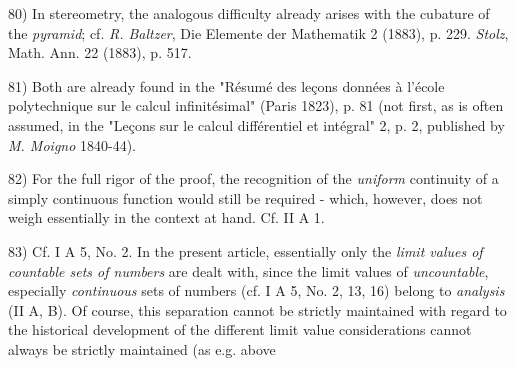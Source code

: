 \vfill
\leftline{\rule{2in}{0.4pt}}
\vspace{0.2cm}
{
\footnotesize
80) In stereometry, the analogous difficulty already arises with the cubature of the \textit{pyramid}; cf. \textit{R. Baltzer}, Die Elemente der Mathematik 2 (1883), p. 229. \textit{Stolz}, Math. Ann. 22 (1883), p. 517.

81) Both are already found in the "Résumé des leçons données à l'école polytechnique sur le calcul infinitésimal" (Paris 1823), p. 81 (not first, as is often assumed, in the "Leçons sur le calcul différentiel et intégral" 2, p. 2, published by \textit{M. Moigno} 1840-44).

82) For the full rigor of the proof, the recognition of the \textit{uniform} continuity of a simply continuous function would still be required - which, however, does not weigh essentially in the context at hand. Cf. II A 1.

83) Cf. I A 5, No. 2. In the present article, essentially only the \textit{limit values of countable sets of numbers} are dealt with, since the limit values of \textit{uncountable}, especially \textit{continuous} sets of numbers (cf. I A 5, No. 2, 13, 16) belong to \textit{analysis} (II A, B). Of course, this separation cannot be strictly maintained with regard to the historical development of the different limit value considerations cannot always be strictly maintained (as e.g. above

}